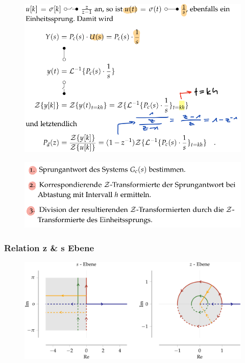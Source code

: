 \documentclass[
  10pt,
  a4paper,
  twocolumn]{article}
\numberwithin{equation}{section}
\begin{document}
\begin{figure}[H]

{\centering \includegraphics{images/paste-62.png}

}

\end{figure}

\begin{figure}[H]

{\centering \includegraphics{images/paste-63.png}

}

\end{figure}

\hypertarget{relation-z-s-ebene}{%
\subsubsection{Relation z \& s Ebene}\label{relation-z-s-ebene}}

\begin{figure}[H]

{\centering \includegraphics{images/paste-61.png}

}

\end{figure}
\end{document}
